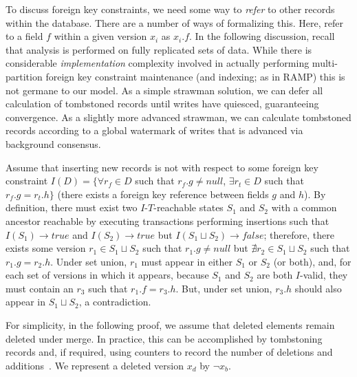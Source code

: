 To discuss foreign key constraints, we need some way to \textit{refer}
to other records within the database. There are a number of ways of
formalizing this. Here, refer to a field $f$ within a given version
$x_i$ as $x_i.f$. In the following discussion, recall that
\iconfluence analysis is performed on fully replicated sets of
data. While there is considerable \textit{implementation} complexity
involved in actually performing multi-partition foreign key constraint
maintenance (and indexing; as in RAMP) this is not germane to our
model. As a simple strawman solution, we can defer all calculation of
tombstoned records until writes have quiesced, guaranteeing
convergence. As a slightly more advanced strawman, we can calculate
tombstoned records according to a global watermark of writes that is
advanced via background consensus.

\begin{claim}
\label{claim:fk-insert}
  Assume that inserting new records is not \iconfluent with respect to some foreign key constraint $I(D) = \{\forall r_f \in D$ such that $r_f.g \neq null$, $\exists r_t \in D$ such that $r_f.g = r_t.h\}$ (there exists a foreign key reference between fields $g$ and $h$). By definition, there must exist two $I$-$T$-reachable states $S_1$ and $S_2$ with a common ancestor reachable by executing transactions performing insertions such that $I(S_1) \rightarrow true$ and $I(S_2) \rightarrow true$ but $I(S_1 \sqcup S_2) \rightarrow false$; therefore, there exists some version $r_1 \in S_1 \sqcup S_2$ such that $r_1.g \neq null$ but $\nexists r_2 \in S_1 \sqcup S_2$ such that $r_1.g = r_2.h$. Under set union, $r_1$ must appear in either $S_1$ or $S_2$ (or both), and, for each set of versions in which it appears, because $S_1$ and $S_2$ are both $I$-valid, they must contain an $r_3$ such that $r_1.f = r_3.h$. But, under set union, $r_3.h$ should also appear in $S_1 \sqcup S_2$, a contradiction.
\end{claim}

For simplicity, in the following proof, we assume that deleted elements remain deleted under merge. In practice, this can be accomplished by tombstoning records and, if required, using counters to record the number of deletions and additions~\cite{crdt}. We represent a deleted version $x_d$ by $\neg x_b$.

